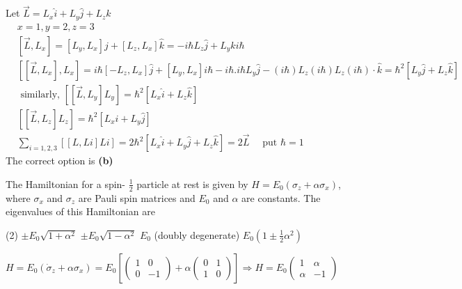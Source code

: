 \begin{enumerate}
\begin{answer}
	 Let $\vec{L}=L_{x} \hat{i}+L_{y} \hat{j}+L_{z} \hat{k}$
	\begin{align*}
	&x=1, y=2, z=3 \\
	&{\left[\vec{L}, L_{x}\right]=\left[L_{y}, L_{x}\right] j+\left[L_{z}, L_{x}\right] \hat{k}=-i \hbar L_{z} \hat{j}+L_{y} \hat{k} i \hbar} \\
	&{\left[\left[\vec{L}, L_{x}\right], L_{x}\right]=i \hbar\left[-L_{z}, L_{x}\right] \hat{j}+\left[L_{y}, L_{x}\right] i \hbar-i \hbar . i \hbar L_{y} \hat{j}-(i \hbar) L_{z}(i \hbar) L_{z}(i \hbar) \cdot \hat{k}=\hbar^{2}\left[L_{y} \hat{j}+L_{z} \hat{k}\right]} \\
	&\text { similarly, }\left[\left[\vec{L}, L_{y}\right] L_{y}\right]=\hbar^{2}\left[L_{x} \hat{i}+L_{z} \hat{k}\right] \\
	&{\left[\left[\vec{L}, L_{z}\right] L_{z}\right]=\hbar^{2}\left[L_{x} \hat{i}+L_{y} \hat{j}\right]} \\
	&\sum_{i=1,2,3}[[L, L i] L i]=2 \hbar^{2}\left[L_{x} \hat{i}+L_{y} \hat{j}+L_{z} \hat{k}\right]=2 \vec{L} \quad \text { put } \hbar=1
	\end{align*}
	The correct option is \textbf{(b)}
\end{answer}
\begin{minipage}{\textwidth}
	\item The Hamiltonian for a spin- $\frac{1}{2}$ particle at rest is given by $H=E_{0}\left(\sigma_{z}+\alpha \sigma_{x}\right)$, where $\sigma_{x}$ and $\sigma_{z}$ are Pauli spin matrices and $E_{0}$ and $\alpha$ are constants. The eigenvalues of this Hamiltonian are
\end{minipage}
\begin{tasks}(2)
	\task[\textbf{A.}] $\pm E_{0} \sqrt{1+\alpha^{2}}$
	\task[\textbf{B.}]$\pm E_{0} \sqrt{1-\alpha^{2}}$
	\task[\textbf{C.}]$E_{0}$ (doubly degenerate)
	\task[\textbf{D.}]$E_{0}\left(1 \pm \frac{1}{2} \alpha^{2}\right)$
\end{tasks}
\begin{answer}
	$ H=E_{0}\left(\dot{\sigma}_{z}+\alpha \sigma_{x}\right)=E_{0}\left[\left(\begin{array}{cc}1 & 0 \\ 0 & -1\end{array}\right)+\alpha\left(\begin{array}{ll}0 & 1 \\ 1 & 0\end{array}\right)\right] \Rightarrow H=E_{0}\left(\begin{array}{cc}1 & \alpha \\ \alpha & -1\end{array}\right)$

\end{answer}
\end{enumerate}
